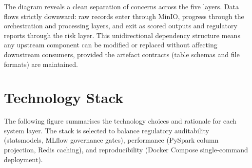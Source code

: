 \documentclass[12pt,a4paper]{report}
\begin{document}
\medskip
\noindent The diagram reveals a clean separation of concerns across the five layers. Data flows strictly downward: raw records enter through MinIO, progress through the orchestration and processing layers, and exit as scored outputs and regulatory reports through the risk layer. This unidirectional dependency structure means any upstream component can be modified or replaced without affecting downstream consumers, provided the artefact contracts (table schemas and file formats) are maintained.

\section{Technology Stack}

%
%
%
%
%

The following figure summarises the technology choices and rationale for each system layer. The stack is selected to balance regulatory auditability (statsmodels, MLflow governance gates), performance (PySpark column projection, Redis caching), and reproducibility (Docker Compose single-command deployment).
\end{document}
